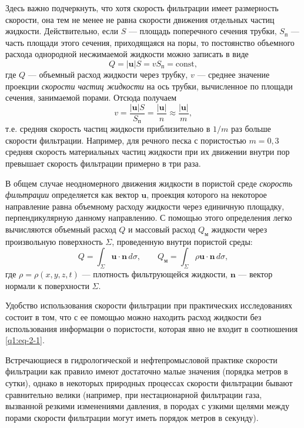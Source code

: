 Здесь важно подчеркнуть, что хотя скорость фильтрации имеет размерность скорости, она тем не менее не равна скорости движения отдельных частиц жидкости. Действительно, если $S$ --- площадь поперечного сечения трубки, $S_{\text{п}}$ --- часть площади этого сечения, приходящаяся на поры, то постоянство объемного расхода однородной несжимаемой жидкости можно записать в виде
\[
Q=|\boldsymbol{u}|S=vS_{\text{п}}=\mathrm{const},
\]
где $Q$ --- объемный расход жидкости через трубку, $v$ --- среднее значение проекции \textit{скорости частиц жидкости} на ось трубки, вычисленное по площади сечения, занимаемой порами. Отсюда получаем
\[
v=\frac{|\boldsymbol{u}|S}{S_{\text{п}}}=\frac{|\boldsymbol{u}|}{n}\approx\frac{|\boldsymbol{u}|}{m},
\]
т.е. средняя скорость частиц жидкости приблизительно в $1/m$ раз больше скорости фильтрации. Например, для речного песка с пористостью $m=0{,}3$ средняя скорость материальных частиц жидкости при их движении внутри пор превышает скорость фильтрации примерно в три раза.

В общем случае неодномерного движения жидкости в пористой среде \textit{скорость фильтрации} определяется как вектор $\boldsymbol{u}$, проекция которого на некоторое направление равна объемному расходу жидкости через единичную площадку, перпендикулярную данному направлению. С помощью этого определения легко вычисляются объемный расход $Q$ и массовый расход $Q_{\text{м}}$ жидкости через произвольную поверхность $\Sigma$, проведенную внутри пористой среды:
\begin{equation}
Q=\int_{\Sigma}\boldsymbol{u}\cdot\boldsymbol{n}\,d\sigma,
\qquad Q_{\text{м}}=\int_{\Sigma}\rho\boldsymbol{u}\cdot\boldsymbol{n}\,d\sigma,
\tag{2.1}\label{q1:eq-2-1}
\end{equation}
где $\rho=\rho(x,y,z,t)$ --- плотность фильтрующейся жидкости, $\boldsymbol{n}$ --- вектор нормали к поверхности $\Sigma$.

Удобство использования скорости фильтрации при практических исследованиях состоит в том, что с ее помощью можно находить расход жидкости без использования информации о пористости, которая явно не входит в соотношения \eqref{q1:eq-2-1}.

Встречающиеся в гидрологической и нефтепромысловой практике скорости фильтрации как правило имеют достаточно малые значения (порядка метров в сутки), однако в некоторых природных процессах скорости фильтрации бывают сравнительно велики (например, при нестационарной фильтрации газа, вызванной резкими изменениями давления, в породах с узкими щелями между порами скорости фильтрации могут иметь порядок метров в секунду).

